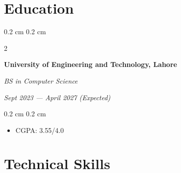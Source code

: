 \documentclass[10pt, a4paper]{article}
\newenvironment{highlights}{
    \begin{itemize}[
        topsep=0.1 cm,
        parsep=0.1 cm,
        partopsep=0pt,
        itemsep=0pt,
        leftmargin=0.4 cm + 10pt
    ]
}{
    \end{itemize}
} %
\newenvironment{onecolentry}{
    \begin{adjustwidth}{
        0.2 cm
    }{
        0.2 cm
    }
}{
    \end{adjustwidth}
} %
\newenvironment{twocolentry}[2][]{
    \onecolentry
    \def\secondColumn{#2}
    \begin{paracol}{2}
}{
    \switchcolumn \raggedleft \secondColumn
    \end{paracol}
    \endonecolentry
} %
\newcommand{\createpointblock}[5]{
    \begin{twocolentry}{
        \textit{#2}

        \textit{#4}}
        \textbf{#1}

        \textit{#3}
    \end{twocolentry}

    \vspace{0.1 cm}
    \begin{onecolentry}
        \begin{highlights}
            #5
        \end{highlights}
    \end{onecolentry}
}
\let\hrefWithoutArrow\href
\renewcommand{\href}[2]{\hrefWithoutArrow{#1}{\ifthenelse{\equal{#2}{}}{}{\textcolor{black}{\uline{#2}}\raisebox{.15ex}{}}}}
\begin{document}

\section{Education}

    \createpointblock{University of Engineering and Technology, Lahore}{Sept 2023 — April 2027 (Expected)}{BS in Computer Science}{}
    {%
        \item CGPA: 3.55/4.0
    }

\sloppy %

\section{Technical Skills}

\end{document}
